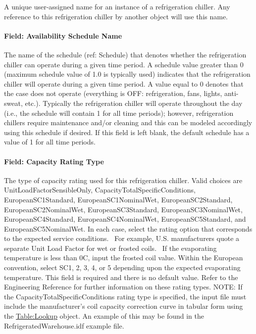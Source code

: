 A unique user-assigned name for an instance of a refrigeration chiller. Any reference to this refrigeration chiller by another object will use this name.

\paragraph{Field: Availability Schedule Name}\label{field-availability-schedule-name-2-007}

The name of the schedule (ref: Schedule) that denotes whether the refrigeration chiller can operate during a given time period. A schedule value greater than 0 (maximum schedule value of 1.0 is typically used) indicates that the refrigeration chiller will operate during a given time period. A value equal to 0 denotes that the case does not operate (everything is OFF: refrigeration, fans, lights, anti-sweat, etc.). Typically the refrigeration chiller will operate throughout the day (i.e., the schedule will contain 1 for all time periods); however, refrigeration chillers require maintenance and/or cleaning and this can be modeled accordingly using this schedule if desired. If this field is left blank, the default schedule has a value of 1 for all time periods.

\paragraph{Field: Capacity Rating Type}\label{field-capacity-rating-type}

The type of capacity rating used for this refrigeration chiller. Valid choices are UnitLoadFactorSensibleOnly, CapacityTotalSpecificConditions, EuropeanSC1Standard, EuropeanSC1NominalWet, EuropeanSC2Standard, EuropeanSC2NominalWet, EuropeanSC3Standard, EuropeanSC3NominalWet, EuropeanSC4Standard, EuropeanSC4NominalWet, EuropeanSC5Standard, and EuropeanSC5NominalWet. In each case, select the rating option that corresponds to the expected service conditions.~ For example, U.S. manufacturers quote a separate Unit Load Factor for wet or frosted coils.~ If the evaporating temperature is less than 0C, input the frosted coil value. Within the European convention, select SC1, 2, 3, 4, or 5 depending upon the expected evaporating temperature. This field is required and there is no default value. Refer to the Engineering Reference for further information on these rating types. NOTE: If the CapacityTotalSpecificConditions rating type is specified, the input file must include the manufacturer's coil capacity correction curve in tabular form using the \hyperref[tablelookup]{Table:Lookup} object. An example of this may be found in the RefrigeratedWarehouse.idf example file.

